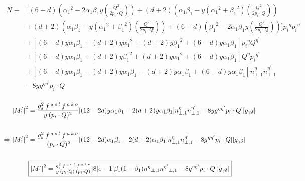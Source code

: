 \begin{equation}
\begin{split}
N\equiv&[(6-d)({\alpha_1}^2 -2\alpha_1 \beta_1 y(\frac{Q^2}{2 p_i \cdot Q}))+(d+2)({\alpha_1}\beta_1 -y({\alpha_1}^2 + {\beta_1}^2 )(\frac{Q^2}{2 p_i \cdot Q}))\\&+(d+2)({\alpha_1}\beta_1 -y({\alpha_1}^2 + {\beta_1}^2 )(\frac{Q^2}{2 p_i \cdot Q}))+(6-d)({\beta_1}^2 -2\alpha_1 \beta_1 y(\frac{Q^2}{2 p_i \cdot Q}))]{p_i}^{{\eta}}{p_i}^{{\eta}^{\prime}}\\
&+[(6-d)y\alpha_1 \beta_1+(d+2)y{\alpha_1}^2+(d+2)y{\beta_1}^2+(6-d)y\alpha_1 \beta_1] {p_i}^{{\eta}}{Q}^{{\eta}^{\prime}}\\
&+[(6-d)y\alpha_1 \beta_1 +(d+2)y{\beta_1}^2+(d+2)y{\alpha_1}^2+(6-d)y\alpha_1 \beta_1] {Q}^{{\eta}}{p_i}^{{\eta}^{\prime}}\\
&+[(6-d)y\alpha_1\beta_1-(d+2)y\alpha_1\beta_1-(d+2)y\alpha_1\beta_1+(6-d)y\alpha_1\beta_1] {n}^{{\eta}}_{\bot,1}{n}^{{\eta}^{\prime}}_{\bot,1}\\
&-8yg^{{\eta}{{\eta}^{\prime}}} p_i \cdot Q\\
\end{split}
\end{equation}

\begin{equation}
\begin{aligned}
\begin{split}
{|{M}^{\prime}_1|}^2 &=\frac{g_s^2 \:f^{\:a\:o\:l}\: f^{\:a\:k\:o}}{y\:(p_i\cdot Q)^2} 
[(12-2d)y\alpha_1\beta_1-2(d+2)y\alpha_1\beta_1] {n}^{{\eta}}_{\bot,1}{n}^{{\eta}^{\prime}}_{\bot,1}-8yg^{{\eta}{{\eta}^{\prime}}} p_i \cdot Q][g_{{\gamma}{{\delta}}}]\\
\\\Rightarrow {|{M}^{\prime}_1|}^2 &=\frac{g_s^2 \:f^{\:a\:o\:l}\: f^{\:a\:k\:o}}{\:(p_i\cdot Q)^2} 
[(12-2d)\alpha_1\beta_1-2(d+2)\alpha_1\beta_1] {n}^{{\eta}}_{\bot,1}{n}^{{\eta}^{\prime}}_{\bot,1}
-8g^{{\eta}{{\eta}^{\prime}}} p_i \cdot Q][g_{{\gamma}{{\delta}}}]\\\\
&\fbox{$ {|{M}^{\prime}_1|}^2 =\frac{g_s^2 \:f^{\:a\:o\:l}\: f^{\:a\:k\:o}}{y\:(p_i\cdot Q) \:(p_i\cdot Q)}
[8[\epsilon-1]{\beta_1}(1-\beta_1){n^{{\eta}}}_{\bot,1}{n^{{\eta}^{\prime}}}_{\bot,1}-8g^{{\eta}{{\eta}^{\prime}}} p_i \cdot Q][g_{{\gamma}{{\delta}}}] $}
\end{split}
\end{aligned}
\end{equation}
\pagebreak
